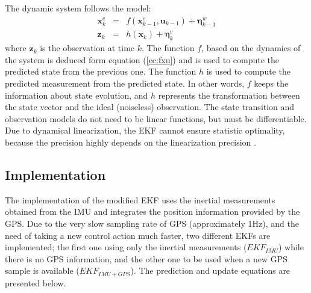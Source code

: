\documentclass[conference]{IEEEtran}
\newcommand{\refp}[1]{(\ref{#1})}
\begin{document}
The dynamic system follows the model:
\begin{eqnarray}
	\mathbf{x}_{k}^e &=& f(\mathbf{x}_{k-1}^e, \mathbf{u}_{k-1}) + \boldsymbol{\eta}^w_{k-1}\\
	\mathbf{z}_{k} &=& h(\mathbf{x}_{k}) + \boldsymbol{\eta}^{v}_{k}
\end{eqnarray}
where $\mathbf{z}_{k}$ is the observation at time $k$. The function $f$, based on the dynamics of the system is deduced form equation \refp{ec:fxu} and is used to compute the predicted state from the previous one. The function $h$ is used to compute the predicted measurement from the predicted state. In other words, $f$ keeps the information about state evolution, and $h$ represents the transformation between the state vector and the ideal (noiseless) observation. The state transition and observation models do not need to be linear functions, but must be differentiable. Due to dynamical linearization, the EKF cannot ensure statistic optimality, because the precision highly depends on the linearization precision \cite{bib:kay}.

\subsection{Implementation}
The implementation of the modified EKF uses the inertial measurements obtained from the IMU and integrates the position information provided by the GPS. Due to the very slow sampling rate of GPS (approximately 1Hz), and the need of taking a new control action much faster, two different EKFs are implemented; the first one using only the inertial measurements ($EKF_{IMU}$) while there is no GPS information, and the other one to be used when a new GPS sample is available ($EKF_{IMU+GPS}$). The prediction and update equations are presented below.\vspace{10pt}
\end{document}
